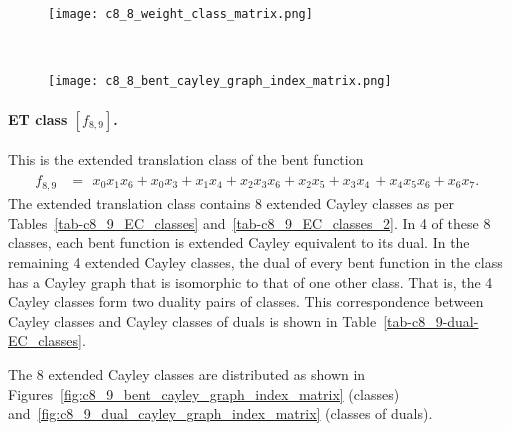 \documentclass[12pt,a4paper]{article}
\begin{document}
\begin{figure}[!bhpt] %
\centering
\begin{minipage}{.48\textwidth}
  \centering
  \texttt{[image: c8\_8\_weight\_class\_matrix.png]}
  \label{fig:c8_8_weight_class_matrix}
\end{minipage}%
~~~~
\begin{minipage}{.48\textwidth}
  \centering
  \texttt{[image: c8\_8\_bent\_cayley\_graph\_index\_matrix.png]}
  \label{fig:c8_8_bent_cayley_graph_index_matrix}
\end{minipage}
\end{figure}

\paragraph*{ET class $[f_{8,9}]$.}
%
%
This is the extended translation class of the bent function
\small{}
\begin{align*}
f_{ 8 , 9 } &=
\begin{array}{l}
x_{0} x_{1} x_{6} + x_{0} x_{3} + x_{1} x_{4} + x_{2} x_{3} x_{6} + x_{2} x_{5} + x_{3} x_{4}\, +
x_{4} x_{5} x_{6} + x_{6} x_{7}.
\end{array}
\end{align*}
\normalsize{}
The extended translation class contains 8 extended Cayley classes as per
Tables~\ref{tab-c8_9_EC_classes} and~\ref{tab-c8_9_EC_classes_2}.
In 4 of these 8 classes, each bent function is extended Cayley equivalent to its dual.
In the remaining 4 extended Cayley classes, the dual of every bent function in the class has a Cayley graph
that is isomorphic to that of one other class. That is, the 4 Cayley classes form two duality pairs of classes.
This correspondence between Cayley classes and Cayley classes of duals is shown in Table~\ref{tab-c8_9-dual-EC_classes}.

The 8 extended Cayley classes are distributed
as shown in Figures~\ref{fig:c8_9_bent_cayley_graph_index_matrix} (classes) and~\ref{fig:c8_9_dual_cayley_graph_index_matrix}
(classes of duals).
\end{document}
